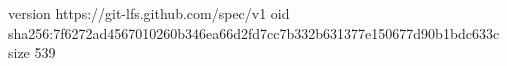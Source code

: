 version https://git-lfs.github.com/spec/v1
oid sha256:7f6272ad4567010260b346ea66d2fd7cc7b332b631377e150677d90b1bdc633c
size 539
